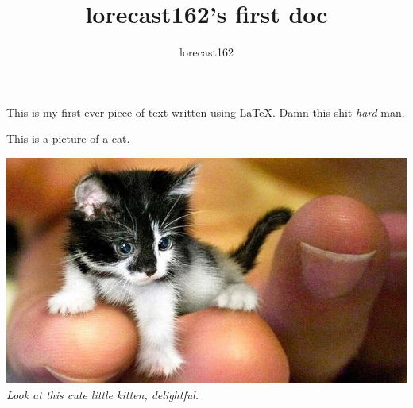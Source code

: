 \documentclass[10pt, a4paper]{article}
\title{lorecast162's first doc}
\author{lorecast162}
\begin{document}
\maketitle
This is my first ever piece of text written using LaTeX.
Damn this shit \textit{hard} man.

This is a picture of a cat.

\includegraphics{cat}
\emph{Look at this cute little kitten, delightful.}
\end{document}
